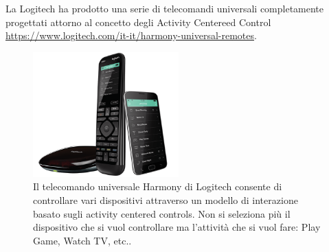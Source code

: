 La Logitech ha prodotto una serie di telecomandi universali completamente progettati attorno al concetto degli Activity Centereed Control \url{https://www.logitech.com/it-it/harmony-universal-remotes}.

	\begin{figure}[!h]
	\centering
	\includegraphics[width=0.5\textwidth]{src/immagini/harmony.png}
	\caption{Il telecomando universale Harmony di Logitech consente di controllare vari dispositivi attraverso un modello di interazione basato sugli activity centered controls. Non si seleziona più il dispositivo che si vuol controllare ma l'attività che si vuol fare: Play Game, Watch TV, etc..}
\end{figure}
